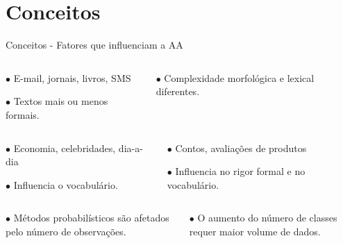 \section{Conceitos}

\begin{frame}{Conceitos - Fatores que influenciam a AA}

\begin{columns}
	\begin{column}{0.48\textwidth}
		\begin{tcolorbox}[title=Canal,height=2cm,valign=center]\selectFont
			$\bullet$ E-mail, jornais, livros, SMS
			
			$\bullet$ Textos mais ou menos formais.                    
		\end{tcolorbox}
	\end{column}
	\begin{column}{0.48\textwidth}
		\begin{tcolorbox}[title=Idioma,height=2cm,valign=center]\selectFont
			$\bullet$ Complexidade morfológica e lexical diferentes.
		\end{tcolorbox}
	\end{column}
\end{columns}
\begin{columns}
	\begin{column}{0.48\textwidth}
		\begin{tcolorbox}[title=Tópico,height=2cm,valign=center]\selectFont
			$\bullet$ Economia, celebridades, dia-a-dia
			
			$\bullet$ Influencia o vocabulário.                    
		\end{tcolorbox}
	\end{column}
	\begin{column}{0.48\textwidth}
		\begin{tcolorbox}[title=Domínio ou Gênero do texto,height=2cm,valign=center]\selectFont
			$\bullet$ Contos,  avaliações de produtos
			
			$\bullet$ Influencia no rigor formal e no vocabulário.
		\end{tcolorbox}
	\end{column}
\end{columns}

\begin{columns}
	\begin{column}{0.48\textwidth}
	\begin{tcolorbox}[title=Tamanho do texto,height=2cm,valign=center]
		$\bullet$ Métodos probabilísticos são afetados pelo número de observações.                  
	\end{tcolorbox}
	\end{column}
	\begin{column}{0.48\textwidth}
	\begin{tcolorbox}[title=Número de autores,height=2cm,valign=center]
		$\bullet$ O aumento do número de classes requer maior volume de dados.                    
	\end{tcolorbox}
	\end{column}
\end{columns}

\end{frame}
